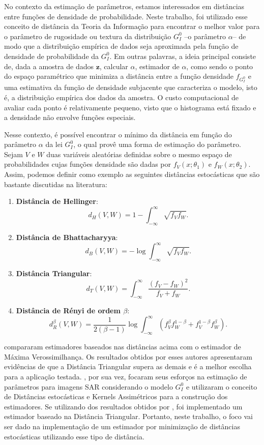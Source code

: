 No contexto da estimação de parâmetros, estamos interessados em distâncias entre funções de densidade de probabilidade. 
Neste trabalho, foi utilizado esse conceito de distância da Teoria da Informação para encontrar o melhor valor para o parâmetro de rugosidade ou textura da distribuição $G_I^0$ --o parâmetro $\alpha$-- de modo que a distribuição empírica de dados seja aproximada pela função de densidade de probabilidade da $G_I^0$. 
Em outras palavras, a ideia principal consiste de, dada a amostra de dados $\bm z$, calcular $\widehat{\alpha}$, estimador de $\alpha$, como sendo o ponto do espaço paramétrico que minimiza a distância entre a função densidade $f_{G_I^0}$ e uma estimativa da função de densidade subjacente que caracteriza o modelo, isto é, a distribuição empírica dos dados da amostra. 
O custo computacional de avaliar cada ponto é relativamente pequeno, visto que o histograma está fixado e a densidade não envolve funções especiais. 

Nesse contexto, é possível encontrar o mínimo da distância em função do parâmetro $\alpha$ da lei $G_I^0$, o qual provê uma forma de estimação do parâmetro. 
Sejam $V$ e $W$ duas variáveis aleatórias definidas sobre o mesmo espaço de probabilidades cujas funções densidade são dadas por $f_V(x; \theta_1)$ e $f_W(x; \theta_2)$. 
Assim, podemos definir como exemplo as seguintes distâncias estocásticas que são bastante discutidas na literatura:
\begin{enumerate}
    \item \textbf{Distância de Hellinger}: $$ d_H(V,W) = 1 - \int_{-\infty}^{\infty}\sqrt{f_V f_W}.$$
    \item \textbf{Distância de Bhattacharyya}: $$d_B(V,W) = -\log\int_{-\infty}^{\infty}\sqrt{f_V f_W}.$$
    \item\textbf{Distância Triangular}: $$d_T(V,W) = \int_{-\infty}^{\infty}\dfrac{(f_V - f_W)^2}{f_V + f_W}.$$
    \item \textbf{Distância de Rényi de ordem $\beta$}: $$d_R^\beta(V,W) = \dfrac{1}{2(\beta-1)}\log\int_{-\infty}^{\infty}(f_V^{\beta}f_W^{1-\beta} + f_V^{1-\beta}f_W^{\beta}).$$
\end{enumerate}

\citet{Cassetti2013} compararam estimadores baseados nas distâncias acima com o estimador de Máxima Verossimilhança. Os resultados obtidos por esses autores apresentaram evidências de que a Distância Triangular supera as demais e é a melhor escolha para a aplicação testada. 
\citet{FreryStochasticDistances2015}, por sua vez, focaram seus esforços na estimação de parâmetros para imagens SAR considerando o modelo $G_I^0$ e utilizaram o conceito de Distâncias estocásticas e Kernels Assimétricos para a construção dos estimadores. 
Se utilizando dos resultados obtidos por \citet{Cassetti2013}, foi implementado um estimador baseado na Distância Triangular. 
Portanto, neste trabalho, o foco vai ser dado na implementação de um estimador por minimização de distâncias estocásticas utilizando esse tipo de distância.

